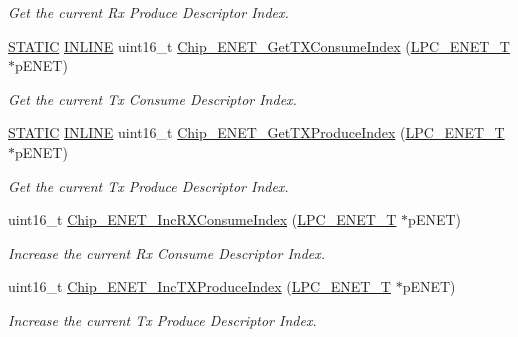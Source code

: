 \begin{DoxyCompactItemize}
\begin{DoxyCompactList}\small\item\em Get the current Rx Produce Descriptor Index. \end{DoxyCompactList}\item 
\hyperlink{group__LPC__Types__Public__Macros_ga10b2d890d871e1489bb02b7e70d9bdfb}{S\+T\+A\+T\+IC} \hyperlink{group__LPC__Types__Public__Types_ga2eb6f9e0395b47b8d5e3eeae4fe0c116}{I\+N\+L\+I\+NE} uint16\+\_\+t \hyperlink{group__ENET__17XX__40XX_ga6ed1ce4f6bde22c64966d2d513cc7a6d}{Chip\+\_\+\+E\+N\+E\+T\+\_\+\+Get\+T\+X\+Consume\+Index} (\hyperlink{structLPC__ENET__T}{L\+P\+C\+\_\+\+E\+N\+E\+T\+\_\+T} $\ast$p\+E\+N\+ET)
\begin{DoxyCompactList}\small\item\em Get the current Tx Consume Descriptor Index. \end{DoxyCompactList}\item 
\hyperlink{group__LPC__Types__Public__Macros_ga10b2d890d871e1489bb02b7e70d9bdfb}{S\+T\+A\+T\+IC} \hyperlink{group__LPC__Types__Public__Types_ga2eb6f9e0395b47b8d5e3eeae4fe0c116}{I\+N\+L\+I\+NE} uint16\+\_\+t \hyperlink{group__ENET__17XX__40XX_ga276d359d20f70fdb005740c3287dd2d7}{Chip\+\_\+\+E\+N\+E\+T\+\_\+\+Get\+T\+X\+Produce\+Index} (\hyperlink{structLPC__ENET__T}{L\+P\+C\+\_\+\+E\+N\+E\+T\+\_\+T} $\ast$p\+E\+N\+ET)
\begin{DoxyCompactList}\small\item\em Get the current Tx Produce Descriptor Index. \end{DoxyCompactList}\item 
uint16\+\_\+t \hyperlink{group__ENET__17XX__40XX_ga4246666fbc4e9be17c45e6837a0e5dca}{Chip\+\_\+\+E\+N\+E\+T\+\_\+\+Inc\+R\+X\+Consume\+Index} (\hyperlink{structLPC__ENET__T}{L\+P\+C\+\_\+\+E\+N\+E\+T\+\_\+T} $\ast$p\+E\+N\+ET)
\begin{DoxyCompactList}\small\item\em Increase the current Rx Consume Descriptor Index. \end{DoxyCompactList}\item 
uint16\+\_\+t \hyperlink{group__ENET__17XX__40XX_ga9a1d6a9086bfbca3c856ad2b3b90546c}{Chip\+\_\+\+E\+N\+E\+T\+\_\+\+Inc\+T\+X\+Produce\+Index} (\hyperlink{structLPC__ENET__T}{L\+P\+C\+\_\+\+E\+N\+E\+T\+\_\+T} $\ast$p\+E\+N\+ET)
\begin{DoxyCompactList}\small\item\em Increase the current Tx Produce Descriptor Index. \end{DoxyCompactList}\item 

\end{DoxyCompactItemize}
